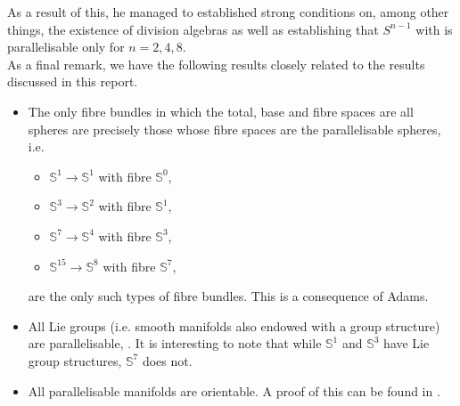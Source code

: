 \documentclass[12pt,a4paper]{article}
\numberwithin{equation}{section}
\theoremstyle{definition}
\theoremstyle{remark}
\begin{document}
As a result of this, he managed to established strong conditions on, among other things, the existence of division algebras as well as establishing that $S^{n-1}$ with is parallelisable only for $n=2,4,8$.\\

As a final remark, we have the following results closely related to the results discussed in this report.
\begin{itemize}
\item The only fibre bundles in which the total, base and fibre spaces are all spheres are precisely those whose fibre spaces are the parallelisable spheres, i.e.
\begin{itemize}
\item $\mathbb{S}^1\to\mathbb{S}^1$ with fibre $\mathbb{S}^0$,
\item $\mathbb{S}^3\to\mathbb{S}^2$ with fibre $\mathbb{S}^1$,
\item $\mathbb{S}^7\to\mathbb{S}^4$ with fibre $\mathbb{S}^3$,
\item $\mathbb{S}^{15}\to\mathbb{S}^8$ with fibre $\mathbb{S}^7$,
\end{itemize} 
are the only such types of fibre bundles. This is a consequence of Adams.
\item All Lie groups (i.e. smooth manifolds also endowed with a group structure) are parallelisable, \cite{MR2954043}. It is interesting to note that while $\mathbb{S}^1$ and $\mathbb{S}^3$ have Lie group structures, $\mathbb{S}^7$ does not.
\item All parallelisable manifolds are orientable. A proof of this can be found in \cite{MR2954043}.
\end{itemize} 

%
%
%
%
%
\pagebreak
\end{document}
